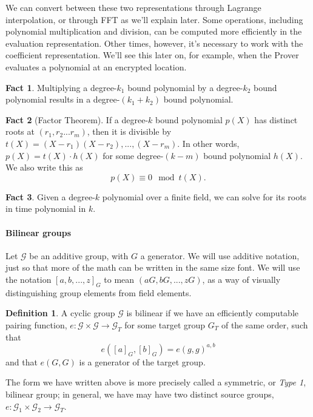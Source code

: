 \documentclass{article}
\theoremstyle{definition}
\newtheorem{definition}{Definition}[section]
\newtheorem{fact}{Fact}[section]
\theoremstyle{remark}
\begin{document}
We can convert between these two representations through Lagrange interpolation, or through FFT as we'll explain later.
Some operations, including polynomial multiplication and division, can be computed more efficiently in the evaluation representation. Other times, however, it's necessary to work with the coefficient representation. We'll see this later on, for example, when the Prover evaluates a polynomial at an encrypted location.

\begin{fact}
Multiplying a degree-$k_1$ bound polynomial by a degree-$k_2$ bound polynomial results in a degree-$(k_1+k_2)$ bound polynomial.
\end{fact}
\begin{fact}[Factor Theorem]
If a degree-$k$ bound polynomial $p(X)$ has distinct roots at $(r_1,r_2...r_m)$, then it is divisible by $t(X) = (X-r_1)(X-r_2),...,(X-r_m)$.
In other words, $p(X) = t(X) \cdot h(X)$ for some degree-$(k-m)$ bound polynomial $h(X)$.
We also write this as
\[
   p(X) \equiv 0 \mod t(X).
\]
\end{fact}
\begin{fact}
Given a degree-$k$ polynomial over a finite field, we can solve for its roots in time polynomial in $k$.
\end{fact}

\paragraph{Bilinear groups}
Let $\mathcal{G}$ be an additive group, with $G$ a generator.
We will use additive notation, just so that more of the math can be written in the same size font.
We will use the notation $\left[a, b, ..., z\right]_G$ to mean $(aG, bG, ..., zG)$, as a way of visually distinguishing group elements from field elements.

\begin{definition}
A cyclic group $\mathcal{G}$ is bilinear if we have an efficiently computable pairing function, $e : \mathcal{G} \times \mathcal{G} \rightarrow \mathcal{G}_T$ for some target group $G_T$ of the same order, such that 
    $$e( \left[a\right]_G, \left[b\right]_G) = e(g,g)^{a,b}$$
and that $e(G,G)$ is a generator of the target group.
\end{definition}

The form we have written above is more precisely called a symmetric, or \emph{Type 1}, bilinear group; in general, we have may have two distinct source groups, $e : \mathcal{G}_1 \times \mathcal{G_2} \rightarrow \mathcal{G}_T$.
\end{document}
